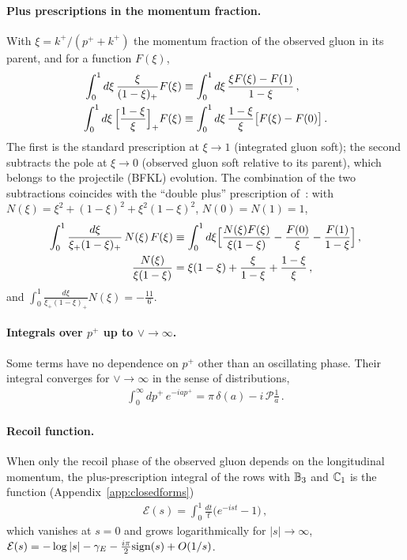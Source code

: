 \paragraph{Plus prescriptions in the momentum fraction.} With $\xi=k^+/(p^++k^+)$ the momentum fraction of the observed gluon in its parent, and for a function $F(\xi)$,
\begin{align}\label{eq:plusxi}
\int_0^1d\xi\,\frac{\xi}{(1-\xi)_+}F(\xi)&\equiv\int_0^1d\xi\,\frac{\xi F(\xi)-F(1)}{1-\xi}\,,\notag\\
\int_0^1d\xi\,\Big[\frac{1-\xi}{\xi}\Big]_+F(\xi)&\equiv\int_0^1d\xi\,\frac{1-\xi}{\xi}\big[F(\xi)-F(0)\big]\,.
\end{align}
The first is the standard prescription at $\xi\to1$ (integrated gluon soft); the second subtracts the pole at $\xi\to0$ (observed gluon soft relative to its parent), which belongs to the projectile (BFKL) evolution. The combination of the two subtractions coincides with the ``double plus'' prescription of~\cite{Kovner:2023vsy}: with $N(\xi)=\xi^2+(1-\xi)^2+\xi^2(1-\xi)^2$, $N(0)=N(1)=1$,
\begin{align}
\int_0^1\frac{d\xi}{\xi_+(1-\xi)_+}\,N(\xi)\,F(\xi)&\equiv\int_0^1d\xi\Big[\frac{N(\xi)F(\xi)}{\xi(1-\xi)}-\frac{F(0)}{\xi}-\frac{F(1)}{1-\xi}\Big]\,,\notag\\
\frac{N(\xi)}{\xi(1-\xi)}&=\xi(1-\xi)+\frac{\xi}{1-\xi}+\frac{1-\xi}{\xi}\,,
\end{align}
and $\int_0^1\frac{d\xi}{\xi_+(1-\xi)_+}N(\xi)=-\frac{11}{6}$.

\paragraph{Integrals over $p^+$ up to $\vee\to\infty$.} Some terms have no dependence on $p^+$ other than an oscillating phase. Their integral converges for $\vee\to\infty$ in the sense of distributions,
\begin{align}\label{eq:distrib}
\int_0^\infty dp^+\,e^{-iap^+}=\pi\,\delta(a)-i\,\mathcal P\frac1a\,.
\end{align}

\paragraph{Recoil function.} When only the recoil phase of the observed gluon depends on the longitudinal momentum, the plus-prescription integral of the rows with $\mathbb{B}_3$ and $\mathbb{C}_1$ is the function (Appendix~\ref{app:closedforms})
\begin{align}\label{eq:Erecoil}
\mathcal E(s)=\int_0^1\frac{dt}{t}\big(e^{-ist}-1\big)\,,
\end{align}
which vanishes at $s=0$ and grows logarithmically for $|s|\to\infty$, $\mathcal E(s)=-\log|s|-\gamma_E-\frac{i\pi}{2}{\rm sign}(s)+O(1/s)$.

